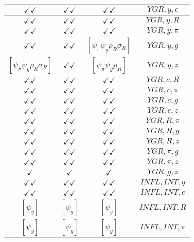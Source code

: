 \documentclass[a4paper,10pt]{article}
\begin{document}
\begin{longtable}{|c|c|c|c|}
$\checkmark\checkmark$ & $\checkmark\checkmark$ & $\checkmark\checkmark$ & ${YGR},{y},{c}$ \\
\hline
$\checkmark\checkmark$ & $\checkmark\checkmark$ & $\checkmark\checkmark$ & ${YGR},{y},{R}$ \\
\hline
$\checkmark\checkmark$ & $\checkmark\checkmark$ & $\checkmark\checkmark$ & ${YGR},{y},{\pi}$ \\
\hline
$\checkmark\checkmark$ & $\checkmark\checkmark$ & $[\psi_\pi \psi_y \rho_R \sigma_R ]$ & ${YGR},{y},{g}$ \\
\hline
$[\psi_\pi \psi_y \rho_R \sigma_R ]$ & $\checkmark\checkmark$ & $[\psi_\pi \psi_y \rho_R ]$ & ${YGR},{y},{z}$ \\
\hline
$\checkmark\checkmark$ & $\checkmark\checkmark$ & $\checkmark\checkmark$ & ${YGR},{c},{R}$ \\
\hline
$\checkmark\checkmark$ & $\checkmark\checkmark$ & $\checkmark\checkmark$ & ${YGR},{c},{\pi}$ \\
\hline
$\checkmark\checkmark$ & $\checkmark\checkmark$ & $\checkmark\checkmark$ & ${YGR},{c},{g}$ \\
\hline
$\checkmark\checkmark$ & $\checkmark\checkmark$ & $\checkmark\checkmark$ & ${YGR},{c},{z}$ \\
\hline
$\checkmark\checkmark$ & $\checkmark\checkmark$ & $\checkmark\checkmark$ & ${YGR},{R},{\pi}$ \\
\hline
$\checkmark\checkmark$ & $\checkmark\checkmark$ & $\checkmark\checkmark$ & ${YGR},{R},{g}$ \\
\hline
$\checkmark\checkmark$ & $\checkmark\checkmark$ & $\checkmark\checkmark$ & ${YGR},{R},{z}$ \\
\hline
$\checkmark\checkmark$ & $\checkmark\checkmark$ & $\checkmark\checkmark$ & ${YGR},{\pi},{g}$ \\
\hline
$\checkmark\checkmark$ & $\checkmark\checkmark$ & $\checkmark\checkmark$ & ${YGR},{\pi},{z}$ \\
\hline
$\checkmark$ & $\checkmark$ & $\checkmark$ & ${YGR},{g},{z}$ \\
\hline
$\checkmark\checkmark$ & $\checkmark\checkmark$ & $\checkmark\checkmark$ & ${INFL},{INT},{y}$ \\
\hline
$\checkmark\checkmark$ & $\checkmark\checkmark$ & $\checkmark\checkmark$ & ${INFL},{INT},{c}$ \\
\hline
$[\psi_y ]$ & $[\psi_y ]$ & $[\psi_y ]$ & ${INFL},{INT},{R}$ \\
\hline
$[\psi_y ]$ & $[\psi_y ]$ & $[\psi_y ]$ & ${INFL},{INT},{\pi}$ \\

\end{longtable}
\end{document}
